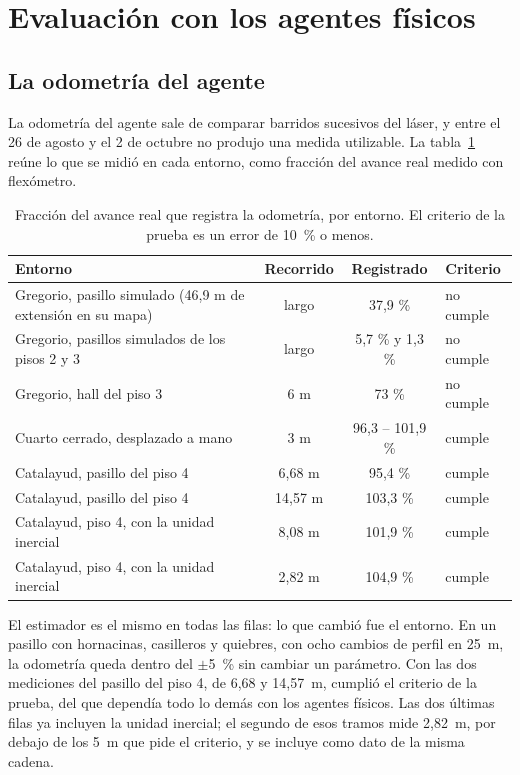 \section{Evaluación con los agentes físicos}
\label{sec:res-hw}

\subsection{La odometría del agente}

La odometría del agente sale de comparar barridos sucesivos del láser, y entre el 26 de agosto y el 2 de octubre no produjo una medida utilizable. La tabla~\ref{tab:odometria}
reúne lo que se midió en cada entorno, como fracción del avance real medido con
flexómetro.

\begin{table}[H]
  \centering\small
  \caption{Fracción del avance real que registra la odometría, por entorno. El
    criterio de la prueba es un error de 10~\% o menos.}
  \label{tab:odometria}
  \begin{tabular}{@{}p{}ccl@{}}
    \toprule
    \textbf{Entorno} & \textbf{Recorrido} & \textbf{Registrado} & \textbf{Criterio} \\ \midrule
    Gregorio, pasillo simulado (46,9 m de extensión en su mapa) & largo & 37,9 \% & no cumple \\
    Gregorio, pasillos simulados de los pisos 2 y 3 & largo & 5,7 \% y 1,3 \% & no cumple \\
    Gregorio, hall del piso 3 & 6 m & 73 \% & no cumple \\
    Cuarto cerrado, desplazado a mano & 3 m & 96,3 -- 101,9 \% & cumple \\
    Catalayud, pasillo del piso 4 & 6,68 m & 95,4 \% & cumple \\
    Catalayud, pasillo del piso 4 & 14,57 m & 103,3 \% & cumple \\
    Catalayud, piso 4, con la unidad inercial & 8,08 m & 101,9 \% & cumple \\
    Catalayud, piso 4, con la unidad inercial & 2,82 m & 104,9 \% & cumple \\ \bottomrule
  \end{tabular}
\end{table}

El estimador es el mismo en todas las filas: lo que cambió fue el entorno. En un pasillo con hornacinas, casilleros y quiebres, con ocho cambios de perfil en 25~m, la odometría queda dentro del $\pm$5~\% sin cambiar un parámetro. Con las dos mediciones del pasillo del piso 4, de 6,68 y 14,57~m, cumplió el criterio de la prueba, del que dependía todo lo demás con los agentes físicos. Las dos últimas filas ya incluyen la unidad inercial; el segundo de esos tramos mide 2,82~m, por debajo de los 5~m que pide el criterio, y se incluye como dato de la misma cadena.

